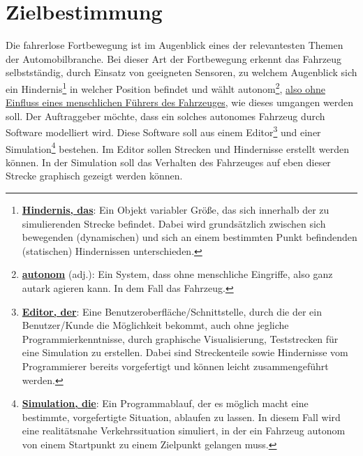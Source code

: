 \documentclass[11pt,a4paper]{article}
\begin{document}
	\section{Zielbestimmung}
		Die fahrerlose Fortbewegung ist im Augenblick eines der relevantesten Themen der Automobilbranche. Bei dieser Art der Fortbewegung erkennt das Fahrzeug selbstständig, durch Einsatz von geeigneten Sensoren, zu welchem Augenblick sich ein Hindernis\footnote{\underline{\textbf{Hindernis, das}}: Ein Objekt variabler Größe, das sich innerhalb der zu simulierenden Strecke befindet. Dabei wird grundsätzlich zwischen sich bewegenden (dynamischen) und sich an einem bestimmten Punkt befindenden (statischen) Hindernissen unterschieden.} in welcher Position befindet und wählt autonom\footnote{\underline{\textbf{autonom}} (adj.): Ein System, dass ohne menschliche Eingriffe, also ganz autark agieren kann. In dem Fall das Fahrzeug.}, \underline{also ohne Einfluss eines menschlichen Führers des Fahrzeuges}, wie dieses umgangen werden soll.
		Der Auftraggeber möchte, dass ein solches autonomes Fahrzeug durch Software modelliert wird. Diese Software soll aus einem Editor\footnote{\underline{\textbf{Editor, der}}: Eine Benutzeroberfläche/Schnittstelle, durch die der ein Benutzer/Kunde die Möglichkeit bekommt, auch ohne jegliche Programmierkenntnisse, durch graphische Visualisierung, Teststrecken für eine Simulation zu erstellen. Dabei sind Streckenteile sowie Hindernisse vom Programmierer bereits vorgefertigt und können leicht zusammengeführt werden.} und einer Simulation\footnote{\underline{\textbf{Simulation, die}}: Ein Programmablauf, der es möglich macht eine bestimmte, vorgefertigte Situation, ablaufen zu lassen. In diesem Fall wird eine realitätsnahe Verkehrssituation simuliert, in der ein Fahrzeug autonom von einem Startpunkt zu einem Zielpunkt gelangen muss. } bestehen. Im Editor sollen Strecken und Hindernisse erstellt werden können. In der Simulation soll das Verhalten des Fahrzeuges auf eben dieser Strecke graphisch gezeigt werden können.
\end{document}
